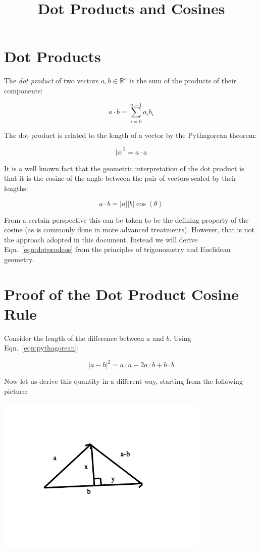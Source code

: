 \documentclass{article}[11pt]
\title{Dot Products and Cosines}
\begin{document}
\maketitle

\section{Dot Products}
The \emph{dot product} of two vectors $a, b \in \mathbb{R}^n$ is the sum of the products of their components:

\[ a \cdot b = \sum_{i=0}^{n-1} a_i b_i \]

The dot product is related to the length of a vector by the Pythagorean theorem:

\begin{equation}
\label{eqn:pythagorean}
|a|^2 = a \cdot a
\end{equation}

It is a well known fact that the geometric interpretation of the dot product is that it is the cosine of the angle between the pair of vectors scaled by their lengths:

\begin{equation}
\label{eqn:dotprodcos}
a \cdot b = |a| |b| \cos(\theta)
\end{equation}

From a certain perspective this can be taken to be the defining property of the cosine (as is commonly done in more advanced treatments).  However, that is not the approach adopted in this document.  Instead we will derive Eqn.~\ref{eqn:dotprodcos} from the principles of trigonometry and Euclidean geometry.

\section{Proof of the Dot Product Cosine Rule}
Consider the length of the difference between $a$ and $b$.  Using Eqn.~\ref{eqn:pythagorean}:

\begin{equation}
\label{eqn:simpledist}
|a - b|^2 = a \cdot a - 2 a \cdot b + b \cdot b
\end{equation}

Now let us derive this quantity in a different way, starting from the following picture:

\includegraphics[width=4in]{triangle.png}
\end{document}
